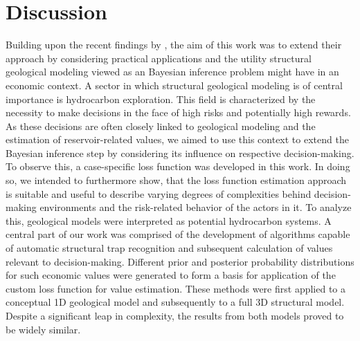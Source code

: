 	\chapter{Discussion}\label{cha:discussion}
	Building upon the recent findings by \citet{delaVarga2016}, the aim of this work was to extend their approach by considering practical applications and the utility structural geological modeling viewed as an Bayesian inference problem might have in an economic context. A sector in which structural geological modeling is of central importance is hydrocarbon exploration. This field is characterized by the necessity to make decisions in the face of high risks and potentially high rewards. As these decisions are often closely linked to geological modeling and the estimation of reservoir-related values, we aimed to use this context to extend the Bayesian inference step by considering its influence on respective decision-making. To observe this, a case-specific loss function was developed in this work. In doing so, we intended to furthermore show, that the loss function estimation approach is suitable and useful to describe varying degrees of complexities behind decision-making environments and the risk-related behavior of the actors in it.
	To analyze this, geological models were interpreted as potential hydrocarbon systems. A central part of our work was comprised of the development of algorithms capable of automatic structural trap recognition and subsequent calculation of values relevant to decision-making. Different prior and posterior probability distributions for such economic values were generated to form a basis for application of the custom loss function for value estimation. These methods were first applied to a conceptual 1D geological model and subsequently to a full 3D structural model. 
	Despite a significant leap in complexity, the results from both models proved to be widely similar.
